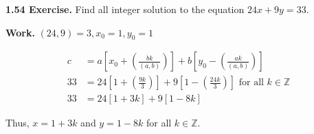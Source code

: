 \documentclass[12pt]{article}
\begin{document}
\noindent\textbf{1.54 Exercise.} Find all integer solution to the equation $24x+9y=33$.

\bigskip

\noindent\textbf{Work.} $(24,9)=3, x_{0}=1, y_{0}=1$

\begin{align*}
c &= a \left[x_{0}+\left(\frac{bk}{(a,b)}\right)\right] +b \left[y_{0}-\left(\frac{ak}{(a,b)}\right)\right] \\
33 &= 24 \left[1+\left(\frac{9k}{3}\right)\right] +9 \left[1-\left(\frac{24k}{3}\right)\right] \text{ for all } k\in\mathbb{Z}\\
33 &= 24 \left[1+3k\right] +9 \left[1-8k\right]
\end{align*}

\noindent Thus, $x=1+3k$ and $y=1-8k$ for all $k\in\mathbb{Z}$.
\end{document}
